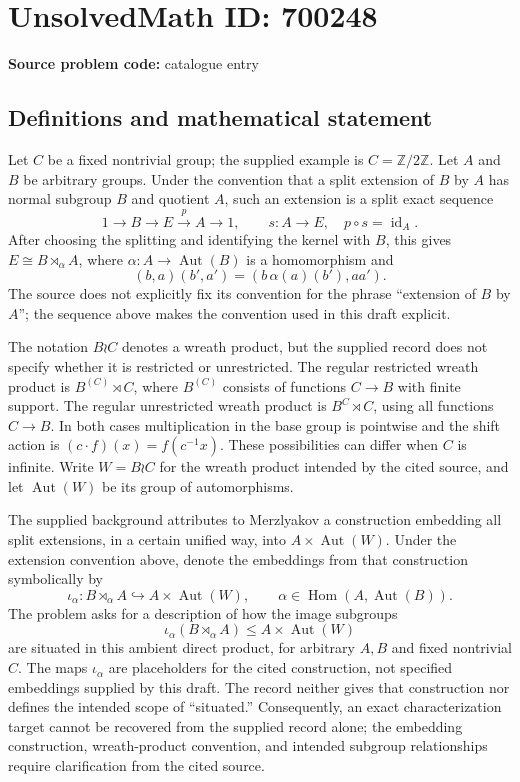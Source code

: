 \documentclass[11pt]{article}
\newcommand{\Z}{\mathbb{Z}}
\begin{document}
\section*{UnsolvedMath ID: 700248}
\textbf{Source problem code:} catalogue entry
\subsection{Definitions and mathematical statement}
Let \(C\) be a fixed nontrivial group; the supplied example is \(C=\Z/2\Z\). Let \(A\) and \(B\) be arbitrary groups. Under the convention that a split extension of \(B\) by \(A\) has normal subgroup \(B\) and quotient \(A\), such an extension is a split exact sequence
\[
1\longrightarrow B\longrightarrow E\overset{p}{\longrightarrow}A\longrightarrow 1,
\qquad s\colon A\longrightarrow E,\quad p\circ s=\operatorname{id}_A.
\]
After choosing the splitting and identifying the kernel with \(B\), this gives \(E\cong B\rtimes_\alpha A\), where \(\alpha\colon A\to\operatorname{Aut}(B)\) is a homomorphism and
\[
(b,a)(b',a')=(b\,\alpha(a)(b'),aa').
\]
The source does not explicitly fix its convention for the phrase ``extension of \(B\) by \(A\)''; the sequence above makes the convention used in this draft explicit.

The notation \(B\wr C\) denotes a wreath product, but the supplied record does not specify whether it is restricted or unrestricted. The regular restricted wreath product is \(B^{(C)}\rtimes C\), where \(B^{(C)}\) consists of functions \(C\to B\) with finite support. The regular unrestricted wreath product is \(B^C\rtimes C\), using all functions \(C\to B\). In both cases multiplication in the base group is pointwise and the shift action is \((c\cdot f)(x)=f(c^{-1}x)\). These possibilities can differ when \(C\) is infinite. Write \(W=B\wr C\) for the wreath product intended by the cited source, and let \(\operatorname{Aut}(W)\) be its group of automorphisms.

The supplied background attributes to Merzlyakov a construction embedding all split extensions, in a certain unified way, into \(A\times\operatorname{Aut}(W)\). Under the extension convention above, denote the embeddings from that construction symbolically by
\[
\iota_\alpha\colon B\rtimes_\alpha A\hookrightarrow A\times\operatorname{Aut}(W),
\qquad \alpha\in\operatorname{Hom}(A,\operatorname{Aut}(B)).
\]
The problem asks for a description of how the image subgroups
\[
\iota_\alpha(B\rtimes_\alpha A)\leq A\times\operatorname{Aut}(W)
\]
are situated in this ambient direct product, for arbitrary \(A,B\) and fixed nontrivial \(C\). The maps \(\iota_\alpha\) are placeholders for the cited construction, not specified embeddings supplied by this draft. The record neither gives that construction nor defines the intended scope of ``situated.'' Consequently, an exact characterization target cannot be recovered from the supplied record alone; the embedding construction, wreath-product convention, and intended subgroup relationships require clarification from the cited source.
\end{document}
